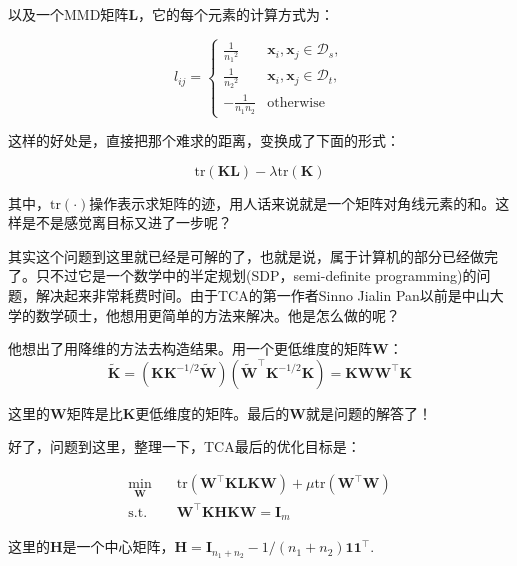 以及一个MMD矩阵$\mathbf{L}$，它的每个元素的计算方式为：

\begin{equation}
	l_{ij}=\begin{cases} \frac{1}{{n_1}^2} & \mathbf{x}_i,\mathbf{x}_j \in \mathcal{D}_s,\\ \frac{1}{{n_2}^2} & \mathbf{x}_i,\mathbf{x}_j \in \mathcal{D}_t,\\ -\frac{1}{n_1 n_2} & \text{otherwise} \end{cases}
\end{equation}

这样的好处是，直接把那个难求的距离，变换成了下面的形式：

\begin{equation}
	\mathrm{tr}(\mathbf{KL})-\lambda \mathrm{tr}(\mathbf{K})
\end{equation}

其中，$\mathrm{tr}(\cdot)$操作表示求矩阵的迹，用人话来说就是一个矩阵对角线元素的和。这样是不是感觉离目标又进了一步呢？

其实这个问题到这里就已经是可解的了，也就是说，属于计算机的部分已经做完了。只不过它是一个数学中的半定规划(SDP，semi-definite programming)的问题，解决起来非常耗费时间。由于TCA的第一作者Sinno Jialin Pan以前是中山大学的数学硕士，他想用更简单的方法来解决。他是怎么做的呢？

他想出了用降维的方法去构造结果。用一个更低维度的矩阵$\mathbf{W}$：
\begin{equation}
	\widetilde{\mathbf{K}}=({\mathbf{K}}{\mathbf{K}}^{-1/2}\widetilde{\mathbf{W}})(\widetilde{\mathbf{W}}^{\top}{\mathbf{K}}^{-1/2}{\mathbf{K}})={\mathbf{K}}\mathbf{W} \mathbf{W}^{\top}{\mathbf{K}}
\end{equation}

这里的$\mathbf{W}$矩阵是比$\mathbf{K}$更低维度的矩阵。最后的$\mathbf{W}$就是问题的解答了！

好了，问题到这里，整理一下，TCA最后的优化目标是：

\begin{equation}
	\begin{split} \min_\mathbf{W} \quad& \mathrm{tr}(\mathbf{W}^\top \mathbf{K} \mathbf{L} \mathbf{K} \mathbf{W}) + \mu \mathrm{tr}(\mathbf{W}^\top \mathbf{W})\\ \text{s.t.} \quad & \mathbf{W}^\top \mathbf{K} \mathbf{H} \mathbf{K} \mathbf{W} = \mathbf{I}_m \end{split} 
\end{equation}

这里的$\mathbf{H}$是一个中心矩阵，$\mathbf{H} = \mathbf{I}_{n_1 + n_2} - 1/(n_1 + n_2)\mathbf{11}^\top$.


